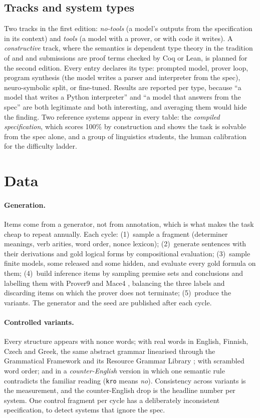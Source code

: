 \documentclass[10pt,a4paper]{article}
\begin{document}
\subsection{Tracks and system types}
Two tracks in the first edition: \emph{no-tools} (a model's outputs from the specification in its context) and \emph{tools} (a model with a prover, or with code it writes). A \emph{constructive} track, where the semantics is dependent type theory in the tradition of \citet{ranta1994} and \citet{chatzikyriakidis2020} and submissions are proof terms checked by Coq or Lean, is planned for the second edition. Every entry declares its type: prompted model, prover loop, program synthesis (the model writes a parser and interpreter from the spec), neuro-symbolic split, or fine-tuned. Results are reported per type, because ``a model that writes a Python interpreter'' and ``a model that answers from the spec'' are both legitimate and both interesting, and averaging them would hide the finding. Two reference systems appear in every table: the \emph{compiled specification}, which scores 100\% by construction and shows the task is solvable from the spec alone, and a group of linguistics students, the human calibration for the difficulty ladder.

\section{Data}
\paragraph{Generation.} Items come from a generator, not from annotation, which is what makes the task cheap to repeat annually. Each cycle: (1)~sample a fragment (determiner meanings, verb arities, word order, nonce lexicon); (2)~generate sentences with their derivations and gold logical forms by compositional evaluation; (3)~sample finite models, some released and some hidden, and evaluate every gold formula on them; (4)~build inference items by sampling premise sets and conclusions and labelling them with Prover9 and Mace4 \citep{mccune2010prover9}, balancing the three labels and discarding items on which the prover does not terminate; (5)~produce the variants. The generator and the seed are published after each cycle.

\paragraph{Controlled variants.} Every structure appears with nonce words; with real words in English, Finnish, Czech and Greek, the same abstract grammar linearised through the Grammatical Framework and its Resource Grammar Library \citep{ranta2004gf}; with scrambled word order; and in a \emph{counter-English} version in which one semantic rule contradicts the familiar reading (\texttt{kro} means \emph{no}). Consistency across variants is the measurement, and the counter-English drop is the headline number per system. One control fragment per cycle has a deliberately inconsistent specification, to detect systems that ignore the spec.
\end{document}
